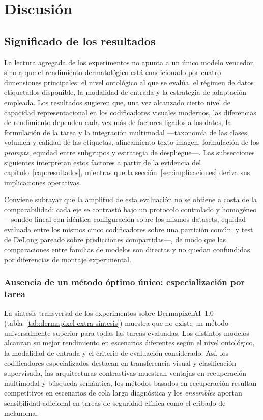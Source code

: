 
\chapter{Discusión}
\label{cap:discusion}

\section{Significado de los resultados}
\label{sec:significado}

La lectura agregada de los experimentos no apunta a un único modelo
vencedor, sino a que el rendimiento dermatológico está condicionado por
cuatro dimensiones principales: el nivel ontológico al que se evalúa, el
régimen de datos etiquetados disponible, la modalidad de entrada y la
estrategia de adaptación empleada. Los resultados sugieren que, una vez
alcanzado cierto nivel de capacidad representacional en los
codificadores visuales modernos, las diferencias de rendimiento
dependen cada vez más de factores ligados a los datos, la formulación de
la tarea y la integración multimodal ---taxonomía de las clases,
volumen y calidad de las etiquetas, alineamiento texto-imagen,
formulación de los \emph{prompts}, equidad entre subgrupos y estrategia
de despliegue---. Las subsecciones siguientes interpretan estos factores
a partir de la evidencia del capítulo~\ref{cap:resultados}, mientras que
la sección~\ref{sec:implicaciones} deriva sus implicaciones operativas.

Conviene subrayar que la amplitud de esta evaluación no se obtiene a
costa de la comparabilidad: cada eje se contrastó bajo un protocolo
controlado y homogéneo ---sondeo lineal con idéntica configuración
sobre los mismos datasets, equidad evaluada entre los mismos cinco
codificadores sobre una partición común, y test de DeLong pareado
sobre predicciones compartidas---, de modo que las comparaciones entre
familias de modelos son directas y no quedan confundidas por
diferencias de montaje experimental.

\subsection{Ausencia de un método óptimo único: especialización por tarea}
\label{sec:disc-especializacion}

La síntesis transversal de los experimentos sobre DermapixelAI~1.0
(tabla~\ref{tab:dermapixel-extra-sintesis}) muestra que no existe un
método universalmente superior para todas las tareas evaluadas. Los
distintos modelos alcanzan su mejor rendimiento en escenarios diferentes
según el nivel ontológico, la modalidad de entrada y el criterio de
evaluación considerado. Así, los codificadores especializados destacan en
transferencia visual y clasificación supervisada, las arquitecturas
contrastivas muestran ventajas en recuperación multimodal y búsqueda
semántica, los métodos basados en recuperación resultan competitivos en
escenarios de cola larga diagnóstica y los \emph{ensembles} aportan
sensibilidad adicional en tareas de seguridad clínica como el cribado de
melanoma.

